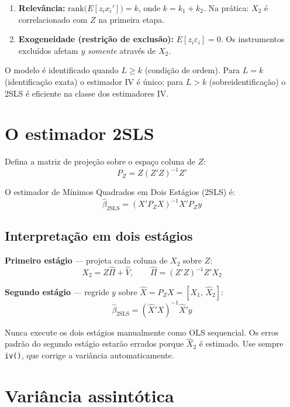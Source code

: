 \begin{enumerate}
  \item \textbf{Relevância:}
        $\mathrm{rank}\bigl(E[z_i x_i']\bigr) = k$, onde $k = k_1 + k_2$.
        Na prática: $X_2$ é correlacionado com $Z$ na primeira etapa.

  \item \textbf{Exogeneidade (restrição de exclusão):}
        $E[z_i \varepsilon_i] = 0$.
        Os instrumentos excluídos afetam $y$ \emph{somente} através de $X_2$.
\end{enumerate}

O modelo é identificado quando $L \geq k$ (condição de ordem). Para
$L = k$ (identificação exata) o estimador IV é único; para $L > k$
(sobreidentificação) o 2SLS é eficiente na classe dos estimadores IV.

\section{O estimador 2SLS}

Defina a matriz de projeção sobre o espaço coluna de $Z$:
\[
  P_Z = Z(Z'Z)^{-1}Z'
\]

O estimador de Mínimos Quadrados em Dois Estágios (2SLS) é:
\[
  \boxed{\hat{\beta}_{\mathrm{2SLS}} = (X'P_Z X)^{-1} X'P_Z y}
\]

\subsection*{Interpretação em dois estágios}

\textbf{Primeiro estágio} — projeta cada coluna de $X_2$ sobre $Z$:
\[
  X_2 = Z\hat{\Pi} + \hat{V}, \qquad \hat{\Pi} = (Z'Z)^{-1}Z'X_2
\]

\textbf{Segundo estágio} — regride $y$ sobre $\hat{X} = P_Z X = [X_1,\, \hat{X}_2]$:
\[
  \hat{\beta}_{\mathrm{2SLS}} = (\hat{X}'X)^{-1}\hat{X}'y
\]

\begin{aviso}
  Nunca execute os dois estágios manualmente como OLS sequencial. Os erros
  padrão do segundo estágio estarão errados porque $\hat{X}_2$ é estimado.
  Use sempre \lstinline{iv()}, que corrige a variância automaticamente.
\end{aviso}

\section{Variância assintótica}

